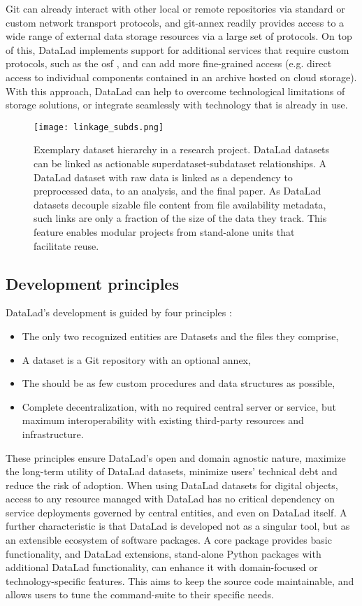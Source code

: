 {Git can already interact with other local or remote repositories via standard or custom network transport protocols, and git-annex readily provides access to a wide range of external data storage resources via a large set of protocols.
On top of this, DataLad implements support for additional services that require custom protocols, such as the \gls{osf} \citep{hanke2021dlosf}, and can add more fine-grained access (e.g. direct access to individual components contained in an archive hosted on cloud storage).
With this approach, DataLad can help to overcome technological limitations of storage solutions, or integrate seamlessly with technology that is already in use.

\begin{figure}
	\centering
	\texttt{[image: linkage\_subds.png]}
	\caption[DataLad dataset linkage]{Exemplary dataset hierarchy in a research project. DataLad datasets can be linked as actionable superdataset-subdataset relationships. A DataLad dataset with raw data is linked as a dependency to preprocessed data, to an analysis, and the final paper. As DataLad datasets decouple sizable file content from file availability metadata, such links are only a fraction of the size of the data they track. This feature enables modular projects from stand-alone units that facilitate reuse.}
	\label{fig:subdslinkage}
\end{figure}

\subsection{Development principles}

DataLad's development is guided by four principles \citep{Halchenko2021}:
\begin{itemize}
	\item The only two recognized entities are Datasets and the files they comprise,
	\item A dataset is a Git repository with an optional annex,
	\item The should be as few custom procedures and data structures as possible,
	\item Complete decentralization, with no required central server or service, but maximum interoperability with existing third-party resources and infrastructure.
\end{itemize}

These principles ensure DataLad's open and domain agnostic nature, maximize the long-term utility of DataLad datasets, minimize users' technical debt and reduce the risk of adoption.
When using DataLad datasets for digital objects, access to any resource managed with DataLad has no critical dependency on service deployments governed by central entities, and even on DataLad itself.
A further characteristic is that DataLad is developed not as a singular tool, but as an extensible ecosystem of software packages.
A core package provides basic functionality, and DataLad extensions, stand-alone Python packages with additional DataLad functionality, can enhance it with domain-focused or technology-specific features.
This aims to keep the source code maintainable, and allows users to tune the command-suite to their specific needs.


}
